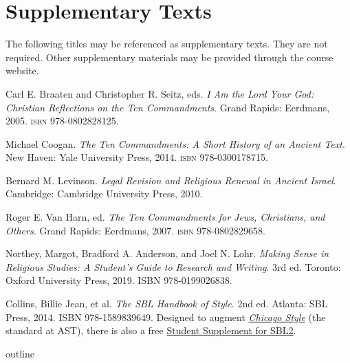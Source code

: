 \documentclass[titlepage]{article}
\begin{document}
\section{Supplementary Texts}
\label{supplementary}

The following titles may be referenced as supplementary texts. They are
not required. Other supplementary materials may be provided through the
course website.

\begingroup
\renewcommand{\section}[2]{}%
\begin{thebibliography}{3}%

	 Carl E. Braaten and Christopher R. Seitz, eds.
	\emph{I Am the Lord Your God: Christian Reflections on the Ten Commandments}.
	Grand Rapids: Eerdmans, 2005.
	\textsc{isbn} 978-0802828125.

	 Michael Coogan.
    \emph{The Ten Commandments: A Short History of an Ancient Text}.
    New Haven: Yale University Press, 2014.
    \textsc{isbn} 978-0300178715.

	 Bernard M. Levinson.
	\emph{Legal Revision and Religious Renewal in Ancient Israel}.
	Cambridge: Cambridge University Press, 2010.

	 Roger E. Van Harn, ed.
	\emph{The Ten Commandments for Jews, Christians, and Others}.
	Grand Rapids: Eerdmans, 2007.
	\textsc{isbn} 978-0802829658.

	 Northey, Margot, Bradford A. Anderson, and Joel N. Lohr.
	\emph{Making Sense in Religious Studies: A Student's Guide to Research and Writing}.
	3rd ed. Toronto: Oxford University Press, 2019. ISBN 978-0199026838.

	 Collins, Billie Jean, et al.
	\emph{The SBL Handbook of Style}.
	2nd ed. Atlanta: SBL Press, 2014. ISBN 978-1589839649.
	Designed to augment \href{http://www.chicagomanualofstyle.org/home.html}{\emph{Chicago Style}}
	(the standard at AST), there is also a free
	\href{https://www.sbl-site.org/assets/pdfs/pubs/SBLHSsupp2015-02.pdf}{Student Supplement for SBL2}.


\end{thebibliography}
\endgroup

\section{Course Outline}
\label{outline}
\end{document}
